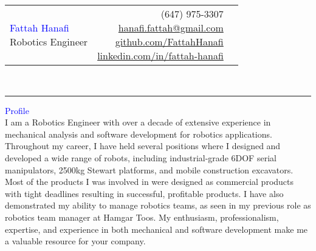 \documentclass{letter}
\newcommand{\firstlastname}[1]{\noindent\textcolor{Blue}{\Huge{#1}}}
\newcommand{\subtitle}[1]{\noindent\textcolor{NavyBlue}{\Large{#1}}}
\newcommand{\header}[1]{\noindent\textcolor{Blue}{\Large{#1}}\\}
\begin{document}
\begin{tabularx}{0.9\textwidth}{X r l}
	\makecell[l]{\firstlastname{Fattah Hanafi} \\\subtitle{Robotics Engineer}} & \makecell[r]{(647) 975-3307\\\href{mailto:hanafi.fattah@gmail.com}{hanafi.fattah@gmail.com}\\\href{https://github.com/FattahHanafi}{github.com/FattahHanafi}\\\href{https://www.linkedin.com/in/fattah-hanafi/}{linkedin.com/in/fattah-hanafi}} & \makecell[c]{\faPhone\\\faEnvelopeO\\\faGithub\\\faLinkedin}
\end{tabularx}\\
\noindent\rule{\textwidth}{0.4pt}

\header{Profile}
\indent\small{I am a Robotics Engineer with over a decade of extensive experience in mechanical analysis and software development for robotics applications. Throughout my career, I have held several positions where I designed and developed a wide range of robots, including industrial-grade 6DOF serial manipulators, 2500kg Stewart platforms, and mobile construction excavators. Most of the products I was involved in were designed as commercial products with tight deadlines resulting in successful, profitable products. I have also demonstrated my ability to manage robotics teams, as seen in my previous role as robotics team manager at Hamgar Toos. My enthusiasm, professionalism, expertise, and experience in both mechanical and software development make me a valuable resource for your company.}
\end{document}
